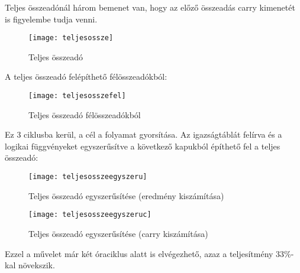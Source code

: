 Teljes összeadónál három bemenet van, hogy az előző összeadás carry kimenetét is figyelembe tudja venni.
\begin{figure}[H]
    \texttt{[image: teljesossze]}
    \centering
    \caption{Teljes összeadó}
    \label{fig:teljesossze}
\end{figure}
A teljes összeadó felépíthető félösszeadókból:
\begin{figure}[H]
    \texttt{[image: teljesosszefel]}
    \centering
    \caption{Teljes összeadó félösszeadókból}
    \label{fig:teljesosszefel}
\end{figure}
Ez 3 ciklusba kerül, a cél a folyamat gyorsítása.
Az igazságtáblát felírva és a logikai függvényeket egyszerűsítve a következő kapukból építhető fel a teljes összeadó:
\begin{figure}[H]
    \texttt{[image: teljesosszeegyszeru]}
    \centering
    \caption{Teljes összeadó egyszerűsítése (eredmény kiszámítása)}
    \label{fig:teljesosszeegyszeru}
\end{figure}
\begin{figure}[H]
    \texttt{[image: teljesosszeegyszeruc]}
    \centering
    \caption{Teljes összeadó egyszerűsítése (carry kiszámítása)}
    \label{fig:teljesosszeegyszeruc}
\end{figure}
Ezzel a művelet már két óraciklus alatt is elvégezhető, azaz a teljesítmény 33\%-kal növekszik.
